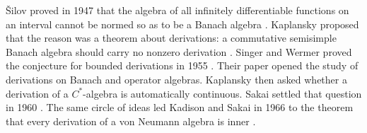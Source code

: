 \v{S}ilov proved in 1947 that the algebra of all infinitely differentiable
functions on an interval cannot be normed so as to be a Banach algebra
\cite[p.~260]{SingerWermer1955}. Kaplansky proposed that the reason was
a theorem about derivations: a commutative semisimple Banach algebra should
carry no nonzero derivation \cite[p.~260]{SingerWermer1955}. Singer and
Wermer proved the conjecture for bounded derivations in 1955
\cite[Theorem~1, p.~260]{SingerWermer1955}. Their paper opened the study of
derivations on Banach and operator algebras. Kaplansky then asked whether a
derivation of a $C^*$-algebra is automatically continuous. Sakai settled that
question in 1960 \cite[p.~31]{Sakai1960Kaplansky}. The same circle of
ideas led Kadison and Sakai in 1966 to the theorem that every derivation
of a von Neumann algebra is inner \cite[Theorem~1, p.~274]{Sakai1966}.

